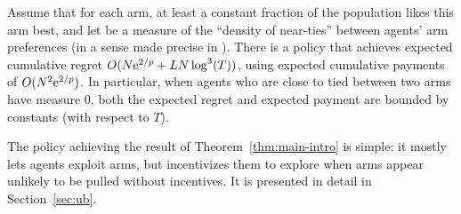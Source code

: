 



\begin{theorem} \label{thm:main-intro}
Assume that for each arm, at least a constant fraction \MinProb
of the population likes this arm best,
and let \TieDensity be a measure of the ``density of near-ties''
between agents' arm preferences
(in a sense made precise in ).
There is a policy that achieves expected 
cumulative regret $O (N \mathrm{e}^{2/p} + L N \log^3(T))$,
using expected cumulative payments of $O(N^2 \mathrm{e}^{2/p})$.
In particular, when agents who are close to tied between two arms have measure $0$,
both the expected regret and expected payment are bounded by constants
(with respect to $T$). 
\end{theorem}


The policy achieving the result of Theorem~\ref{thm:main-intro} is
simple: it mostly lets agents exploit arms, but incentivizes
them to explore when arms appear unlikely to be pulled without incentives.
It is presented in detail in Section~\ref{sec:ub}.
